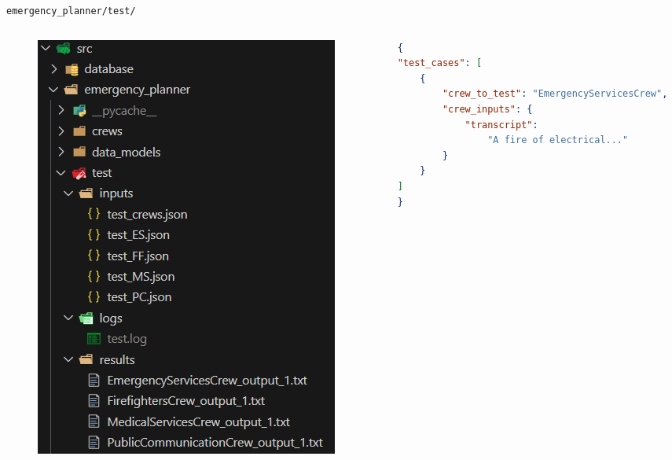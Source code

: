 \begin{frame}[fragile]{\texttt{emergency\_planner/test/}}
    \begin{columns}
        \begin{column}{0.33\textwidth}
            \begin{figure}
                \includegraphics[width=\textwidth]{figures/test_folder_structure.png}
            \end{figure}
        \end{column}
        \begin{column}{0.67\textwidth}
            \begin{lstlisting}[language=json,caption={Input Example}]
{
"test_cases": [
    {
        "crew_to_test": "EmergencyServicesCrew",
        "crew_inputs": {
            "transcript": 
                "A fire of electrical..."
        }
    }
]
}    
            \end{lstlisting}
        \end{column}
    \end{columns}
\end{frame}